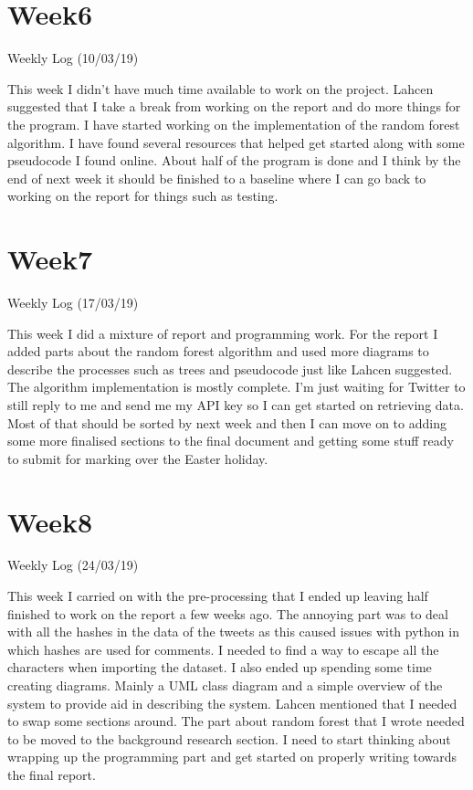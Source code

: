 \section{Week6}
Weekly Log (10/03/19)

This week I didn’t have much time available to work on the project. Lahcen suggested that I take a break from working on the report and do more things for the program.
I have started working on the implementation of the random forest algorithm. I have found several resources that helped get started along with some pseudocode I found online. About half of the program is done and I think by the end of next week it should be finished to a baseline where I can go back to working on the report for things such as testing. 

\section{Week7}
Weekly Log (17/03/19)

This week I did a mixture of report and programming work. For the report I added parts about the random forest algorithm and used more diagrams to describe the processes such as trees and pseudocode just like Lahcen suggested. 
The algorithm implementation is mostly complete. I’m just waiting for Twitter to still reply to me and send me my API key so I can get started on retrieving data. 
Most of that should be sorted by next week and then I can move on to adding some more finalised sections to the final document and getting some stuff ready to submit for marking over the Easter holiday.

\section{Week8}
Weekly Log (24/03/19)

This week I carried on with the pre-processing that I ended up leaving half finished to work on the report a few weeks ago. The annoying part was to deal with all the hashes in the data of the tweets as this caused issues with python in which hashes are used for comments. I needed to find a way to escape all the characters when importing the dataset. 
I also ended up spending some time creating diagrams. Mainly a UML class diagram and a simple overview of the system to provide aid in describing the system. 
Lahcen mentioned that I needed to swap some sections around. The part about random forest that I wrote needed to be moved to the background research section. 
I need to start thinking about wrapping up the programming part and get started on properly writing towards the final report.
